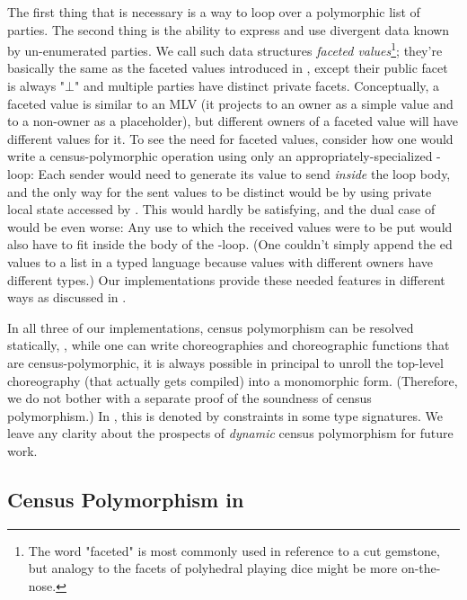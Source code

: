 The first thing that is necessary is a way to loop over a polymorphic list of parties.
The second thing is the ability to express and use divergent data known by un-enumerated parties.
We call such data structures \emph{faceted values}\footnote{
    The word "faceted" is most commonly used in reference to a cut gemstone,
    but analogy to the facets of polyhedral playing dice might be more on-the-nose.
};
they're basically the same as the faceted values introduced in \cite{austin2012},
except their public facet is always "$\bot$" and multiple parties have distinct private facets.
Conceptually, a faceted value is similar to an MLV
(it projects to an owner as a simple value and to a non-owner as a placeholder),
but different owners of a faceted value will have different values for it.
To see the need for faceted values, consider how one would write a census-polymorphic  operation
using only an appropriately-specialized -loop:
Each sender would need to generate its value to send \emph{inside} the loop body,
and the only way for the sent values to be distinct would be by using private local state accessed by .
This would hardly be satisfying, and the dual case of  would be even worse:
Any use to which the received values were to be put would also have to fit inside the body of the -loop.
(One couldn't simply append the ed values to a list in a typed language
because  values with different owners have different types.)
Our implementations provide these needed features in different ways as discussed in .

In all three of our implementations, census polymorphism can be resolved statically,
\ie, while one can write choreographies and choreographic functions that are census-polymorphic,
it is always possible in principal to unroll the top-level choreography
(that actually gets compiled)
into a monomorphic form.
(Therefore, we do not bother with a separate proof of the soundness of census polymorphism.)
In \MultiChor, this is denoted by  constraints in some type signatures.
We leave any clarity about the prospects of \emph{dynamic} census polymorphism for future work.


\subsection{Census Polymorphism in \MultiChor}
\label{sec:census-poly-haskell}

